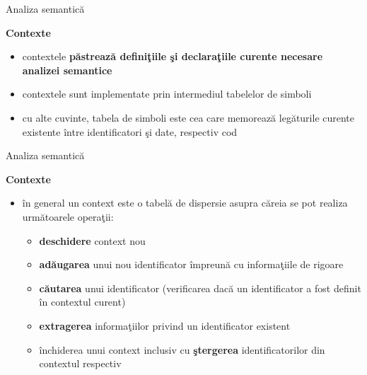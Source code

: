 \documentclass[pdf]{beamer}
\begin{document}
\begin{frame}{Analiza semantică}

\textbf{Contexte}

\begin{itemize}
\item
contextele \textbf{păstrează definiţiile şi declaraţiile curente necesare analizei semantice}

\item
contextele sunt implementate prin intermediul tabelelor de simboli

\item
cu alte cuvinte, tabela de simboli este cea care memorează legăturile curente existente între identificatori şi date, respectiv cod
\end{itemize}
\end{frame}



\begin{frame}{Analiza semantică}

\textbf{Contexte}

\begin{itemize}
\item
în general un context este o tabelă de dispersie asupra căreia se pot realiza următoarele operaţii: 
\begin{itemize}
\item
\textbf{deschidere} context nou
\item
\textbf{adăugarea} unui nou identificator împreună cu informaţiile de rigoare
\item
\textbf{căutarea} unui identificator (verificarea dacă un identificator a fost definit în contextul curent)
\item
\textbf{extragerea} informaţiilor privind un identificator existent
\item
închiderea unui context inclusiv cu \textbf{ştergerea} identificatorilor din contextul respectiv
\end{itemize}
\end{itemize}
\end{frame}
\end{document}
